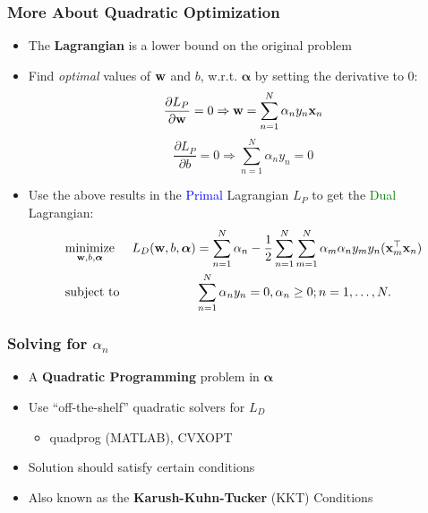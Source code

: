 \documentclass[10pt]{beamer}
\begin{document}
\begin{frame}
      {
        \frametitle{More About Quadratic Optimization}
      }
      \begin{itemize}
        \item The {\bf Lagrangian} is a lower bound on the original problem
        \item Find {\em optimal} values of ${\bf w}$ and $b$, w.r.t. ${\bm \alpha}$ by setting the derivative to 0:
          \[
          \frac{\partial L_P}{\partial {\bf w}} = 0 \Rightarrow {\bf w} = \sum_{n=1}^N \alpha_ny_n{\bf x}_n
          \]
          \[
          \frac{\partial L_P}{\partial b} = 0 \Rightarrow \sum_{n=1}^N \alpha_ny_n = 0
          \]
          \item Use the above results in the \textcolor{blue}{Primal} Lagrangian $L_P$ to get the \textcolor{green}{Dual} Lagrangian:
      \begin{equation*}
        \begin{aligned}
          & \underset{{\bf w},b,{\bm \alpha}}{\text{minimize}}
          & L_D({\bf w},b,{\bm \alpha}) & = \sum_{n=1}^N \alpha_n - \frac{1}{2}\sum_{n=1}^N\sum_{m=1}^N \alpha_m\alpha_ny_my_n({\bf x}_m^\top{\bf x}_n)\\
          & \text{subject to}
          & & \sum_{n=1}^N\alpha_ny_n = 0, \alpha_n \geq 0; n = 1, \ldots, N.
        \end{aligned}
      \end{equation*}
      \end{itemize}
\end{frame}
\begin{frame}
\frametitle{Solving for $\alpha_n$}
\begin{itemize}
\item A {\bf Quadratic Programming} problem in ${\bm \alpha}$
\item Use ``off-the-shelf'' quadratic solvers for $L_D$
  \begin{itemize}
  \item quadprog (MATLAB), CVXOPT
  \end{itemize}
  \item Solution should satisfy certain conditions
  \item Also known as the {\bf Karush-Kuhn-Tucker} (KKT) Conditions
\end{itemize}
\end{frame}
\end{document}
